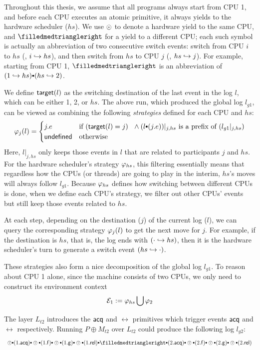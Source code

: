 Throughout this thesis, we assume that all programs always
start from CPU 1, and before each CPU executes an atomic primitive,
it always yields to the hardware scheduler ($hs$).
We use $\odot$ to denote a hardware yield to the same CPU,
and $\sdiff$ for a yield to a different CPU; each such symbol
is actually an abbreviation of two consecutive switch events: switch
from CPU $i$ to $hs$ (\ie, $i\hookrightarrow{}hs$), and then switch from $hs$
to CPU $j$ (\ie, $hs \hookrightarrow j$).  For example, starting from CPU 1,
$\sdiff$ is an abbreviation of $(1\switch{}hs) \cons (hs\switch 2)$.

We define $\mathsf{target}(l)$ as the switching destination of the last event in
the log $l$, which can be either 1, 2, or $hs$. The above run,
which produced the global log $l_{g1}$, can be viewed as combining
the following {\em strategies} defined for each CPU and $hs$:
\[
\strat{j} (l)=
\begin{cases}
  j.e & \text{if } (\comm{target}(l) = j) ~~\wedge 
      (l\cons (j.e)) |_{j,hs} \text{ is a prefix of } (l_{g1} |_{j,hs}) \\
\comm{undefined } & \text{otherwise}
\end{cases}
\]
\noindent{}Here, $l |_{j,hs}$ only keeps those events in $l$ that are
related to participants $j$ and $hs$.  For the hardware scheduler's
strategy $\varphi_{hs}$, this filtering essentially means that
regardless how the CPUs (or threads) are going to play in the interim,
$hs$'s moves will always follow $l_{g1}$.  Because $\varphi_{hs}$
defines how switching between different CPUs is done, when we define
each CPU's strategy, we filter out other CPUs' events but still keep
those events related to $hs$.

At each step, depending on the destination ($j$) of the current log
($l$), we can query the corresponding strategy $\varphi_{j}(l)$ to get the
next move for $j$.  For example, if the destination is $hs$, that is,
the log ends with $(\cdot\hookrightarrow hs)$, then it is the
hardware scheduler's turn to generate a switch event $(hs\hookrightarrow \cdot)$.

These strategies also form a nice decomposition of the global log
$l_{g1}$. To reason about CPU 1 alone, since the machine consists of two CPUs, we only need to construct
its environment context 
\[\mathcal{E}_1 := \varphi_{hs} \bigcup \varphi_{2}\]

The layer $L_{t2}$ introduces the $\mathsf{acq}$ and $\rel$ primitives
which trigger events $\mathsf{acq}$ and $\rel$ respectively. Running
$P\oplus{}M_{t2}$ over $L_{t2}$ could produce the following  log $l_{g2}$:
\[
\begin{array}{l}
\ssame \cons (1.\acq) \cons
\ssame \cons (1.\comm{f}) \cons
\ssame \cons (1.\comm{g}) \cons
\ssame \cons (1.\rel) 
\cons \sdiff \cons (2.\acq) \cons
\ssame \cons (2.\comm{f}) \cons
\ssame \cons (2.\comm{g}) \cons
\ssame \cons (2.\rel) 
\end{array}
\]

